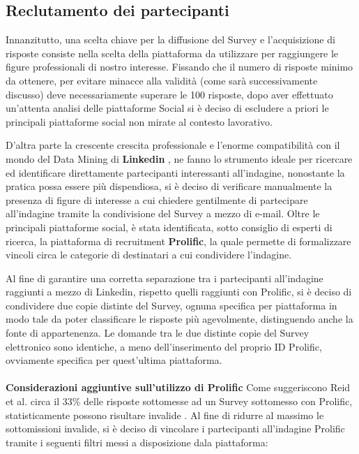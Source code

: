     \subsection{Reclutamento dei partecipanti}
    
    Innanzitutto, una scelta chiave per la diffusione del Survey e l'acquisizione di risposte consiste nella scelta della piattaforma da utilizzare per raggiungere le figure professionali di nostro interesse. Fissando che il numero di risposte minimo da ottenere, per evitare minacce alla validità (come sarà successivamente discusso) deve necessariamente superare le 100 risposte, dopo aver effettuato un'attenta analisi delle piattaforme Social si è deciso di escludere a priori le principali piattaforme social non mirate al contesto lavorativo. 
    
    D'altra parte la crescente crescita professionale e l'enorme compatibilità con il mondo del Data Mining di \textbf{Linkedin} \cite{sumbaly2013big}, ne fanno lo strumento ideale per ricercare ed identificare direttamente partecipanti interessanti all'indagine, nonostante la pratica possa essere più dispendiosa, si è deciso di verificare manualmente la presenza di figure di interesse a cui chiedere gentilmente di partecipare all'indagine tramite la condivisione del Survey a mezzo di e-mail.  Oltre le principali piattaforme social, è stata identificata, sotto consiglio di esperti di ricerca, la piattaforma di recruitment \textbf{Prolific}, la quale permette di formalizzare vincoli circa le categorie di destinatari a cui condividere l'indagine. 
    
    Al fine di garantire una corretta separazione tra i partecipanti all'indagine raggiunti a mezzo di Linkedin, rispetto quelli raggiunti con Prolific, si è deciso di condividere due copie distinte del Survey, ognuna specifica per piattaforma in modo tale da poter classificare le risposte più agevolmente, distinguendo anche la fonte di appartenenza. Le domande tra le due distinte copie del Survey elettronico sono identiche, a meno dell'inserimento del proprio ID Prolific, ovviamente specifica per quest'ultima piattaforma.\\\\
    
    \textbf{Considerazioni aggiuntive sull'utilizzo di Prolific}
    Come suggeriscono Reid et al. circa il 33\% delle risposte sottomesse ad un Survey sottomesso con Prolific, statisticamente possono risultare invalide \cite{reid2022software}. Al fine di ridurre al massimo le sottomissioni invalide, si è deciso di vincolare i partecipanti all'indagine Prolific tramite i seguenti filtri messi a disposizione dala piattaforma:
    
